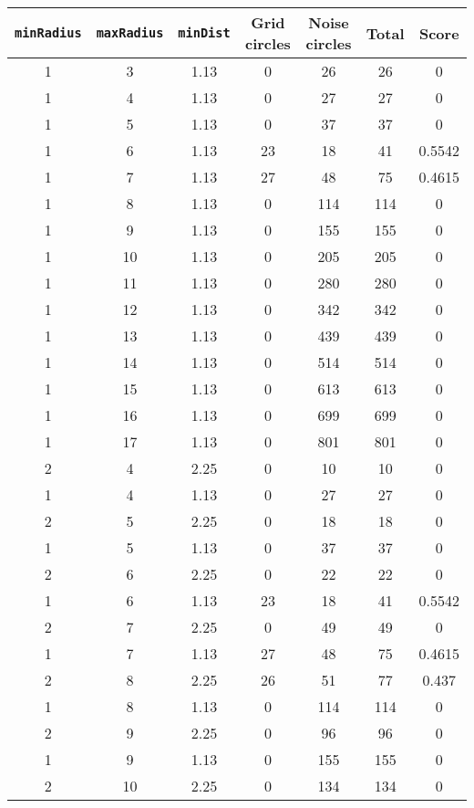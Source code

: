\documentclass[letterpaper, 12pt]{article}
\begin{document}
\begin{longtable}{|c|c|c|c|c|c|c|}
\hline
\textbf{\texttt{minRadius}} & \textbf{\texttt{maxRadius}} & \textbf{\texttt{minDist}} & \textbf{Grid circles} & \textbf{Noise circles} & \textbf{Total} & \textbf{Score} \\
\hline
1 & 3 & 1.13 & 0 & 26 & 26 & 0 \\
\hline
1 & 4 & 1.13 & 0 & 27 & 27 & 0 \\
\hline
1 & 5 & 1.13 & 0 & 37 & 37 & 0 \\
\hline
1 & 6 & 1.13 & 23 & 18 & 41 & 0.5542 \\
\hline
1 & 7 & 1.13 & 27 & 48 & 75 & 0.4615 \\
\hline
1 & 8 & 1.13 & 0 & 114 & 114 & 0 \\
\hline
1 & 9 & 1.13 & 0 & 155 & 155 & 0 \\
\hline
1 & 10 & 1.13 & 0 & 205 & 205 & 0 \\
\hline
1 & 11 & 1.13 & 0 & 280 & 280 & 0 \\
\hline
1 & 12 & 1.13 & 0 & 342 & 342 & 0 \\
\hline
1 & 13 & 1.13 & 0 & 439 & 439 & 0 \\
\hline
1 & 14 & 1.13 & 0 & 514 & 514 & 0 \\
\hline
1 & 15 & 1.13 & 0 & 613 & 613 & 0 \\
\hline
1 & 16 & 1.13 & 0 & 699 & 699 & 0 \\
\hline
1 & 17 & 1.13 & 0 & 801 & 801 & 0 \\
\hline
2 & 4 & 2.25 & 0 & 10 & 10 & 0 \\
\hline
1 & 4 & 1.13 & 0 & 27 & 27 & 0 \\
\hline
2 & 5 & 2.25 & 0 & 18 & 18 & 0 \\
\hline
1 & 5 & 1.13 & 0 & 37 & 37 & 0 \\
\hline
2 & 6 & 2.25 & 0 & 22 & 22 & 0 \\
\hline
1 & 6 & 1.13 & 23 & 18 & 41 & 0.5542 \\
\hline
2 & 7 & 2.25 & 0 & 49 & 49 & 0 \\
\hline
1 & 7 & 1.13 & 27 & 48 & 75 & 0.4615 \\
\hline
2 & 8 & 2.25 & 26 & 51 & 77 & 0.437 \\
\hline
1 & 8 & 1.13 & 0 & 114 & 114 & 0 \\
\hline
2 & 9 & 2.25 & 0 & 96 & 96 & 0 \\
\hline
1 & 9 & 1.13 & 0 & 155 & 155 & 0 \\
\hline
2 & 10 & 2.25 & 0 & 134 & 134 & 0 \\

\end{longtable}
\end{document}
